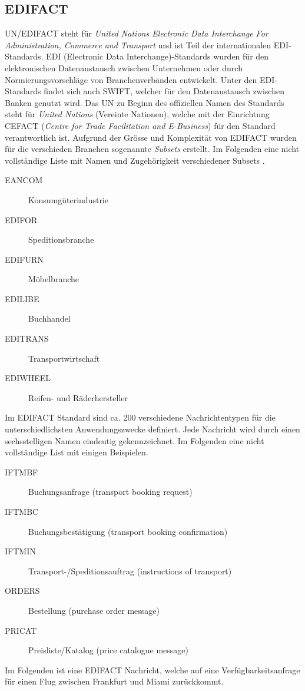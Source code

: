 \subsection{EDIFACT}
UN/EDIFACT steht für \textit{United Nations Electronic Data Interchange For Administration, Commerce and Transport} und ist Teil der internationalen EDI-Standards. EDI (Electronic Data Interchange)-Standards wurden für den elektronischen Datenaustausch zwischen Unternehmen oder durch Normierungsvorschläge von Branchenverbänden entwickelt. Unter den EDI-Standards findet sich auch SWIFT, welcher für den Datenaustausch zwischen Banken genutzt wird. Das UN zu Beginn des offiziellen Namen des Standards steht für \textit{United Nations} (Vereinte Nationen), welche mit der Einrichtung CEFACT (\textit{Centre for Trade Facilitation and E-Business}) für den Standard verantwortlich ist. Aufgrund der Grösse und Komplexität von EDIFACT wurden für die verschieden Branchen sogenannte \textit{Subsets} erstellt. Im Folgenden eine nicht vollständige Liste mit Namen und Zugehörigkeit verschiedener Subsets \citep[S.1]{thopasEDIFACT}.
\begin{description}
	\item [EANCOM] Konsumgüterindustrie
	\item [EDIFOR] Speditionsbranche
	\item [EDIFURN] Möbelbranche
	\item [EDILIBE] Buchhandel
	\item [EDITRANS] Transportwirtschaft
	\item [EDIWHEEL] Reifen- und Räderhersteller
\end{description}
Im EDIFACT Standard sind ca. 200 verschiedene Nachrichtentypen für die unterschiedlichsten Anwendungszwecke definiert. Jede Nachricht wird durch einen sechsstelligen Namen eindeutig gekennzeichnet. Im Folgenden eine nicht vollständige List mit einigen Beispielen.
\begin{description}
	\item [IFTMBF] Buchungsanfrage (transport booking request)
	\item [IFTMBC] Buchungsbestätigung (transport booking confirmation)
	\item [IFTMIN] Transport-/Speditionsauftrag (instructions of transport)
	\item [ORDERS] Bestellung (purchase order message)
	\item [PRICAT] Preisliste/Katalog (price catalogue message)
\end{description}
Im Folgenden ist eine EDIFACT Nachricht, welche auf eine Verfügbarkeitsanfrage für einen Flug zwischen Frankfurt und Miami zurückkommt.
